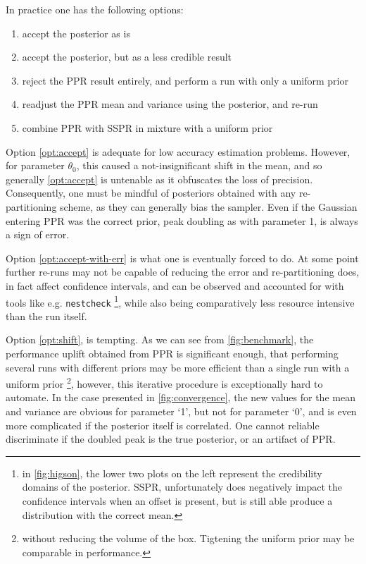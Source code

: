 \documentclass[usenatbib]{mnras}
\begin{document}
In practice one has the following options: 
\begin{enumerate}
\item accept the posterior as is \label{opt:accept}
\item accept the posterior, but as a less credible result \label{opt:accept-with-err}
\item reject the PPR result entirely, and perform a run with only a uniform prior \label{opt:uniform}
\item readjust the PPR mean and variance using the posterior, and re-run \label{opt:shift}
\item combine PPR with SSPR in mixture with a uniform prior
\end{enumerate}
Option \ref{opt:accept} is adequate for low accuracy estimation
problems. However, for parameter \(\theta_{0}\), this caused a
not-insignificant shift in the mean, and so generally \ref{opt:accept}
is untenable as it obfuscates the loss of precision. Consequently,
one must be mindful of posteriors obtained with any re-partitioning
scheme, as they can generally bias the sampler. Even if the Gaussian
entering PPR was the correct prior, peak doubling as with parameter
1, is always a sign of error. 

Option \ref{opt:accept-with-err} is what one is eventually forced to
do. At some point further re-runs may not be capable of reducing the
error and re-partitioning does, in fact affect confidence intervals,
and can be observed and accounted for with tools like
e.g. \texttt{nestcheck} \footnote{in \autoref{fig:higson}, the lower two plots on
the left represent the credibility domains of the posterior. SSPR,
unfortunately does negatively impact the confidence intervals when
an offset is present, but is still able produce a distribution with
the correct mean.}, while also being comparatively less resource
intensive than the run itself.

Option \ref{opt:shift}, is tempting. As we can see from
\autoref{fig:benchmark}, the performance uplift obtained from PPR is
significant enough, that performing several runs with different
priors may be more efficient than a single run with a uniform prior
\footnote{without reducing the volume of the box. Tigtening the uniform
prior may be comparable in performance.}, however, this iterative
procedure is exceptionally hard to automate. In the case presented
in \autoref{fig:convergence}, the new values for the mean and variance
are obvious for parameter `1', but not for parameter `0', and is
even more complicated if the posterior itself is correlated. One
cannot reliable discriminate if the doubled peak is the true
posterior, or an artifact of PPR.
\end{document}
